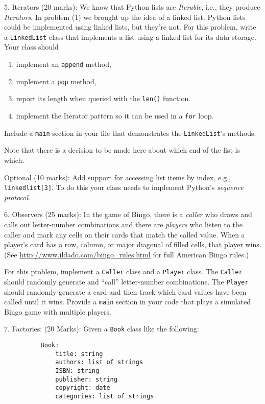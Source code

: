 \documentclass{article}
\begin{document}
\vspace{3mm}    
5. Iterators (20 marks): We know that Python lists are \emph{Iterable}, i.e., they produce \emph{Iterators}. In problem (1) we brought up the idea of a linked list. Python lists could be implemented using linked lists, but they're not. For this problem, write a \texttt{LinkedList} class that implements a list using a linked list for its data storage. Your class should 
  \begin{enumerate}
      \item implement an \texttt{append} method,
      \item implement a \texttt{pop} method,
      \item report its length when queried with the \texttt{len()} function.
      \item implement the Iterator pattern so it can be used in a \texttt{for} loop.
  \end{enumerate}
  
  Include a \texttt{main} section in your file that demonstrates the \texttt{LinkedList}'s methods. 
  
  Note that there is a decision to be made here about which end of the list is which.
  
Optional (10 marks): Add support for accessing list items by index, e.g., \texttt{linkedlist[3]}. To do this your class needs to implement Python's \emph{sequence protocol}.  

\vspace{3mm}  
6. Observers (25 marks): In the game of Bingo, there is a \emph{caller} who draws and calls out letter-number combinations and there are \emph{players} who listen to the caller and mark any cells on their cards that match the called value. When a player's card has a row, column, or major diagonal
of filled cells, that player wins. (See \url{http://www.ildado.com/bingo_rules.html} for full American Bingo rules.)  

For this problem, implement a \texttt{Caller} class and a \texttt{Player} class. The \texttt{Caller} should randomly generate and ``call'' letter-number combinations. The \texttt{Player} should randomly generate a card and then track which card values have been called until it wins. Provide a \texttt{main} section in your code that plays a simulated Bingo game with multiple players.

\vspace{3mm}     
7. Factories: (20 Marks): Given a \texttt{Book} class like the following:
\begin{verbatim}
          Book:
              title: string
              authors: list of strings
              ISBN: string
              publisher: string
              copyright: date
              categories: list of strings
\end{verbatim}
\end{document}
